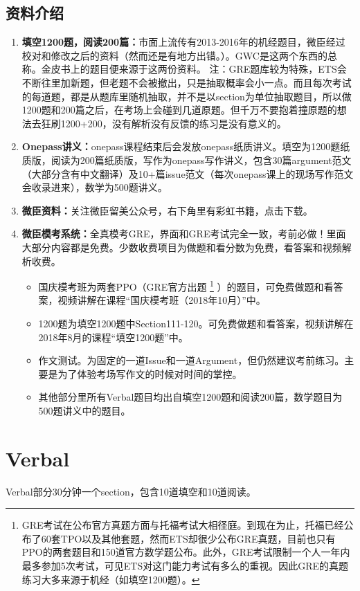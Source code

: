 \documentclass[cn,plain]{elegantbookex}
\begin{document}
\section{资料介绍}
\begin{enumerate}
    \item \textbf{填空1200题，阅读200篇：}市面上流传有2013-2016年的机经题目，微臣经过校对和修改之后的资料（然而还是有地方出错。）。GWC是这两个东西的总称。金皮书上的题目便来源于这两份资料。
    注：GRE题库较为特殊，ETS会不断往里加新题，但老题不会被撤出，只是抽取概率会小一点。而且每次考试的每道题，都是从题库里随机抽取，并不是以section为单位抽取题目，所以做1200题和200篇之后，在考场上会碰到几道原题。但千万不要抱着撞原题的想法去狂刷1200+200，没有解析没有反馈的练习是没有意义的。
    \item \textbf{Onepass讲义：}onepass课程结束后会发放onepass纸质讲义。填空为1200题纸质版，阅读为200篇纸质版，写作为onepass写作讲义，包含30篇argument范文（大部分含有中文翻译）及10+篇issue范文（每次onepass课上的现场写作范文会收录进来），数学为500题讲义。
    \item \textbf{微臣资料：}关注微臣留美公众号，右下角里有彩虹书籍，点击下载。
    \item \textbf{微臣模考系统：}全真模考GRE，界面和GRE考试完全一致，考前必做！里面大部分内容都是免费。少数收费项目为做题和看分数为免费，看答案和视频解析收费。
    \begin{itemize}
        \item 国庆模考班为两套PPO（GRE官方出题
        \footnote{GRE考试在公布官方真题方面与托福考试大相径庭。到现在为止，托福已经公布了60套TPO以及其他套题，然而ETS却很少公布GRE真题，目前也只有PPO的两套题目和150道官方数学题公布。此外，GRE考试限制一个人一年内最多参加5次考试，可见ETS对这门能力考试有多么的重视。因此GRE的真题练习大多来源于机经（如填空1200题）。}
        ）的题目，可免费做题和看答案，视频讲解在课程``国庆模考班（2018年10月）''中。
        \item 1200题为填空1200题中Section111-120。可免费做题和看答案，视频讲解在2018年8月的课程``填空1200题''中。
        \item 作文测试。为固定的一道Issue和一道Argument，但仍然建议考前练习。主要是为了体验考场写作文的时候对时间的掌控。
        \item 其他部分里所有Verbal题目均出自填空1200题和阅读200篇，数学题目为500题讲义中的题目。
    \end{itemize}
\end{enumerate}

\chapter{Verbal}
Verbal部分30分钟一个section，包含10道填空和10道阅读。
\end{document}
